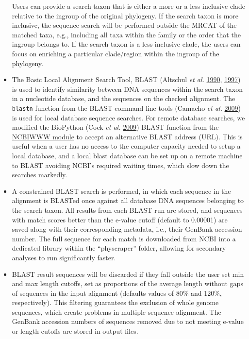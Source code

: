 \documentclass[]{article}
\begin{document}
\begin{itemize}
  Users can provide a search taxon that is either a more or a less inclusive
  clade relative to the ingroup of the original phylogeny. If the search taxon is more inclusive, the sequence search will be performed outside the MRCAT of the matched taxa, e.g., including all taxa within
  the family or the order that the ingroup belongs to. If the search taxon is a less inclusive clade, the users can focus on enriching a particular clade/region within the ingroup of the phylogeny.
\item
  The Basic Local Alignment Search Tool, BLAST (Altschul \emph{et al.} \protect\hyperlink{ref-altschul1990basic}{1990}, \protect\hyperlink{ref-altschul1997gapped}{1997}) is used to identify
  similarity between DNA sequences within the search taxon in a nucleotide
  database, and the sequences on the checked alignment.
  The \texttt{blastn} function from the BLAST command line tools (Camacho \emph{et al.} \protect\hyperlink{ref-camacho2009blast}{2009}) is used for local database sequence searches.
  For remote database searches, we modified the BioPython (Cock \emph{et al.} \protect\hyperlink{ref-cock2009biopython}{2009}) BLAST function from the \href{https://biopython.org/DIST/docs/api/Bio.Blast.NCBIWWW-module.html}{NCBIWWW module} to accept an alternative BLAST address (URL). This is useful when a user has no access to the computer capacity needed to setup a local database, and a local blast database can be set up on a remote machine to BLAST avoiding NCBI's required waiting times, which slow down the searches markedly.
\item
  A constrained BLAST search is performed, in which each sequence
  in the alignment is BLASTed once against all database DNA sequences belonging to the search
  taxon. All results from each BLAST run are stored, and sequences with match scores better than the e-value cutoff (default to 0.00001) are saved
  along with their corresponding metadata, i.e., their GenBank accession number.
  The full sequence for each match is downloaded from NCBI into a dedicated library within the ``physcraper'' folder, allowing for secondary analyses to run significantly faster.
\item
  BLAST result sequences will be discarded if they fall outside the user set min and max length cutoffs, set as proportions of the average length without gaps of sequences in the input alignment (defaults values of 80\% and 120\%, respectively).
  This filtering guarantees the exclusion of whole genome sequences, which create problems in multiple sequence alignment.
  The GenBank accession numbers of sequences removed due to not meeting e-value or length cutoffs are stored in output files.

\end{itemize}
\end{document}
